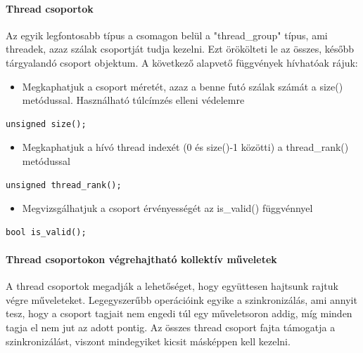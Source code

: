\paragraph{Thread csoportok}
Az egyik legfontosabb típus a csomagon belül a "thread\_group" típus, ami threadek, azaz szálak csoportját tudja kezelni. Ezt örökölteti le az összes, később tárgyalandó csoport objektum. A következő alapvető függvények hívhatóak rájuk:

\begin{itemize}
	\item Megkaphatjuk a csoport méretét, azaz a benne futó szálak számát a size() metódussal. Használható túlcímzés elleni védelemre
\end{itemize}	

\begin{lstlisting}[style=CStyle]
	unsigned size();
\end{lstlisting}

\begin{itemize}
	\item Megkaphatjuk a hívó thread indexét (0 és size()-1 közötti) a thread\_rank() metódussal
\end{itemize}	

\begin{lstlisting}[style=CStyle]
	unsigned thread_rank();
\end{lstlisting}

\begin{itemize}	
	\item Megvizsgálhatjuk a csoport érvényességét az is\_valid() függvénnyel
\end{itemize}

\begin{lstlisting}[style=CStyle]
	bool is_valid();
\end{lstlisting}


\paragraph{Thread csoportokon végrehajtható kollektív műveletek}

A thread csoportok megadják a lehetőséget, hogy együttesen hajtsunk rajtuk végre műveleteket. Legegyszerűbb operációink egyike a szinkronizálás, ami annyit tesz, hogy a csoport tagjait nem engedi túl egy műveletsoron addig, míg minden tagja el nem jut az adott pontig. Az összes thread csoport fajta támogatja a szinkronizálást, viszont mindegyiket kicsit másképpen kell kezelni.

